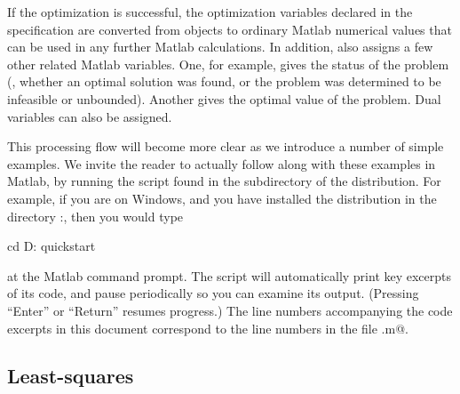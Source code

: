 \documentclass[12pt]{article}
\begin{document}
If the optimization is successful,
the optimization variables declared in the \cvx specification
are converted from objects to ordinary Matlab numerical values
that can be used in any further Matlab calculations. In addition,
\cvx also assigns a few other related Matlab variables.
One, for example, gives the status of the problem (\ie, whether an
optimal solution was found, or the problem was determined to be 
infeasible or unbounded).  Another gives the optimal value
of the problem. Dual variables can also be assigned.

This processing flow will become more clear as we introduce
a number of simple examples. We invite the reader to actually follow
along with these examples in Matlab, by running the \verb@quickstart@
script found in the \verb@examples@ subdirectory of the \cvx distribution. 
For example,
if you are on Windows, and you have installed the \cvx distribution
in the directory \verb@D:\Matlab\cvx@, then you would type
\begin{code}
	cd D:\Matlab\cvx\examples
	quickstart
\end{code}
at the Matlab command prompt.
The script will automatically print key excerpts of its code, and
pause periodically so you can examine its output. (Pressing ``Enter''
or ``Return'' resumes progress.) 
The line numbers accompanying the code excerpts in this
document correspond to the line numbers in the file \verb@quickstart.m@.

\subsection{Least-squares}
\label{sec:leastsquares}
\end{document}
